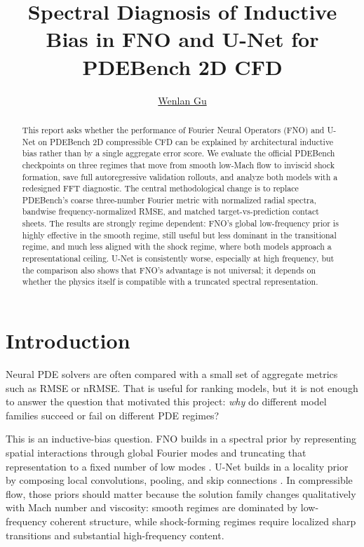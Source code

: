 \documentclass[11pt]{article}
\title{Spectral Diagnosis of Inductive Bias in FNO and U-Net for PDEBench 2D CFD}
\author{\href{mailto:wg2139@nyu.edu}{Wenlan Gu}}
\date{\vspace{-5ex}}
\begin{document}
\maketitle
\thispagestyle{firstpage}

\begin{abstract}
This report asks whether the performance of Fourier Neural Operators (FNO) and U-Net on PDEBench 2D compressible CFD can be explained by architectural inductive bias rather than by a single aggregate error score. We evaluate the official PDEBench checkpoints on three regimes that move from smooth low-Mach flow to inviscid shock formation, save full autoregressive validation rollouts, and analyze both models with a redesigned FFT diagnostic. The central methodological change is to replace PDEBench's coarse three-number Fourier metric with normalized radial spectra, bandwise frequency-normalized RMSE, and matched target-vs-prediction contact sheets. The results are strongly regime dependent: FNO's global low-frequency prior is highly effective in the smooth regime, still useful but less dominant in the transitional regime, and much less aligned with the shock regime, where both models approach a representational ceiling. U-Net is consistently worse, especially at high frequency, but the comparison also shows that FNO's advantage is not universal; it depends on whether the physics itself is compatible with a truncated spectral representation.
\end{abstract}

\section{Introduction}
Neural PDE solvers are often compared with a small set of aggregate metrics such as RMSE or nRMSE. That is useful for ranking models, but it is not enough to answer the question that motivated this project: \emph{why} do different model families succeed or fail on different PDE regimes?

This is an inductive-bias question. FNO builds in a spectral prior by representing spatial interactions through global Fourier modes and truncating that representation to a fixed number of low modes \cite{li2021fourier}. U-Net builds in a locality prior by composing local convolutions, pooling, and skip connections \cite{ronneberger2015unet}. In compressible flow, those priors should matter because the solution family changes qualitatively with Mach number and viscosity: smooth regimes are dominated by low-frequency coherent structure, while shock-forming regimes require localized sharp transitions and substantial high-frequency content.
\end{document}
